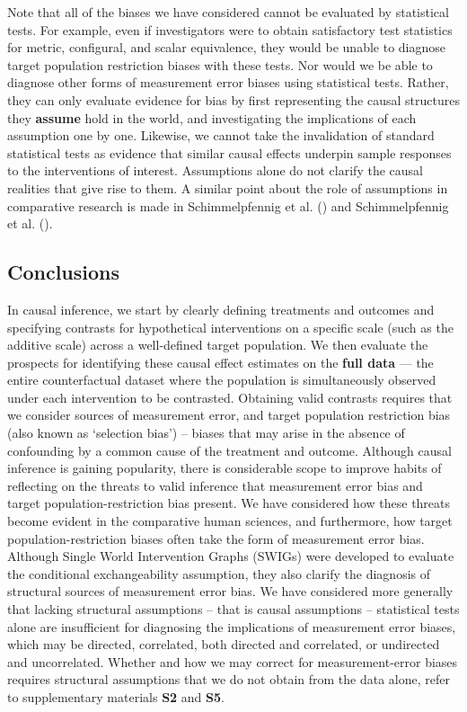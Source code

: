 \documentclass[
  single column]{article}
\begin{document}
Note that all of the biases we have considered cannot be evaluated by
statistical tests. For example, even if investigators were to obtain
satisfactory test statistics for metric, configural, and scalar
equivalence, they would be unable to diagnose target population
restriction biases with these tests. Nor would we be able to diagnose
other forms of measurement error biases using statistical tests. Rather,
they can only evaluate evidence for bias by first representing the
causal structures they \textbf{assume} hold in the world, and
investigating the implications of each assumption one by one. Likewise,
we cannot take the invalidation of standard statistical tests as
evidence that similar causal effects underpin sample responses to the
interventions of interest. Assumptions alone do not clarify the causal
realities that give rise to them. A similar point about the role of
assumptions in comparative research is made in Schimmelpfennig et al.
() and Schimmelpfennig et
al. ().

\subsection{Conclusions}\label{conclusions}

In causal inference, we start by clearly defining treatments and
outcomes and specifying contrasts for hypothetical interventions on a
specific scale (such as the additive scale) across a well-defined target
population. We then evaluate the prospects for identifying these causal
effect estimates on the \textbf{full data} --- the entire counterfactual
dataset where the population is simultaneously observed under each
intervention to be contrasted. Obtaining valid contrasts requires that
we consider sources of measurement error, and target population
restriction bias (also known as `selection bias') -- biases that may
arise in the absence of confounding by a common cause of the treatment
and outcome. Although causal inference is gaining popularity, there is
considerable scope to improve habits of reflecting on the threats to
valid inference that measurement error bias and target
population-restriction bias present. We have considered how these
threats become evident in the comparative human sciences, and
furthermore, how target population-restriction biases often take the
form of measurement error bias. Although Single World Intervention
Graphs (SWIGs) were developed to evaluate the conditional
exchangeability assumption, they also clarify the diagnosis of
structural sources of measurement error bias. We have considered more
generally that lacking structural assumptions -- that is causal
assumptions -- statistical tests alone are insufficient for diagnosing
the implications of measurement error biases, which may be directed,
correlated, both directed and correlated, or undirected and
uncorrelated. Whether and how we may correct for measurement-error
biases requires structural assumptions that we do not obtain from the
data alone, refer to supplementary materials \textbf{S2} and
\textbf{S5}.
\end{document}

